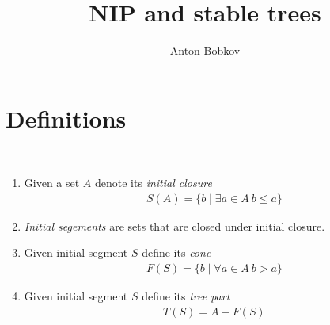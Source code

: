 \documentclass{amsart}
\begin{document}
\title{NIP and stable trees}
\author{Anton Bobkov}

\maketitle

\section{Definitions}

\begin{Definition}\ 
	\begin{enumerate}
		\item Given a set $A$ denote its \emph{initial closure} 
		\begin{align*}
			S(A) = \{b \mid \exists a \in A \ b \leq a\}
		\end{align*}
		\item \emph{Initial segements} are sets that are closed under initial closure.
		\item Given initial segment $S$ define its \emph{cone}
		\begin{align*}
			F(S) = \{b \mid \forall a \in A \ b > a\}
		\end{align*}
		\item Given initial segment $S$ define its \emph{tree part}
		\begin{align*}
			T(S) = A - F(S)
		\end{align*}
	\end{enumerate}
\end{Definition}
\end{document}

